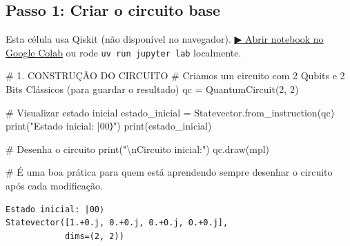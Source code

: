 \documentclass[
  brazilian,
]{report}
\newenvironment{Shaded}{\begin{snugshade}}{\end{snugshade}}
\newcommand{\BuiltInTok}[1]{\textcolor[rgb]{0.00,0.23,0.31}{#1}}
\newcommand{\CharTok}[1]{\textcolor[rgb]{0.13,0.47,0.30}{#1}}
\newcommand{\CommentTok}[1]{\textcolor[rgb]{0.37,0.37,0.37}{#1}}
\newcommand{\DecValTok}[1]{\textcolor[rgb]{0.68,0.00,0.00}{#1}}
\newcommand{\NormalTok}[1]{\textcolor[rgb]{0.00,0.23,0.31}{#1}}
\newcommand{\OperatorTok}[1]{\textcolor[rgb]{0.37,0.37,0.37}{#1}}
\newcommand{\StringTok}[1]{\textcolor[rgb]{0.13,0.47,0.30}{#1}}
\begin{document}
\subsection{Passo 1: Criar o circuito
base}\label{passo-1-criar-o-circuito-base}

\begin{tcolorbox}[enhanced jigsaw, arc=.35mm, bottomrule=.15mm, bottomtitle=1mm, breakable, colback=white, colbacktitle=quarto-callout-warning-color!10!white, colframe=quarto-callout-warning-color-frame, coltitle=black, left=2mm, leftrule=.75mm, opacityback=0, opacitybacktitle=0.6, rightrule=.15mm, title=\textcolor{quarto-callout-warning-color}{\faExclamationTriangle}\hspace{0.5em}{⚛️ Célula Qiskit --- execute no Colab ou localmente}, titlerule=0mm, toprule=.15mm, toptitle=1mm]

Esta célula usa Qiskit (não disponível no navegador).
\href{https://colab.research.google.com/github/maxwellamaral/aula-quantum/blob/main/notebooks/01-intro.ipynb}{▶
Abrir notebook no Google Colab} ou rode \texttt{uv\ run\ jupyter\ lab}
localmente.

\begin{Shaded}
\begin{Highlighting}[]

\CommentTok{\# 1. CONSTRUÇÃO DO CIRCUITO}
\CommentTok{\# Criamos um circuito com 2 Qubits e 2 Bits Clássicos (para guardar o resultado)}
\NormalTok{qc }\OperatorTok{=}\NormalTok{ QuantumCircuit(}\DecValTok{2}\NormalTok{, }\DecValTok{2}\NormalTok{)}

\CommentTok{\# Visualizar estado inicial}
\NormalTok{estado\_inicial }\OperatorTok{=}\NormalTok{ Statevector.from\_instruction(qc)}
\BuiltInTok{print}\NormalTok{(}\StringTok{"Estado inicial: |00⟩"}\NormalTok{)}
\BuiltInTok{print}\NormalTok{(estado\_inicial)}

\CommentTok{\# Desenha o circuito}
\BuiltInTok{print}\NormalTok{(}\StringTok{"}\CharTok{\textbackslash{}n}\StringTok{Circuito inicial:"}\NormalTok{)}
\NormalTok{qc.draw(}\StringTok{\textquotesingle{}mpl\textquotesingle{}}\NormalTok{)}

\CommentTok{\# É uma boa prática para quem está aprendendo sempre desenhar o circuito após cada modificação.}
\end{Highlighting}
\end{Shaded}

\end{tcolorbox}

\begin{verbatim}
Estado inicial: |00⟩
Statevector([1.+0.j, 0.+0.j, 0.+0.j, 0.+0.j],
            dims=(2, 2))
\end{verbatim}
\end{document}
